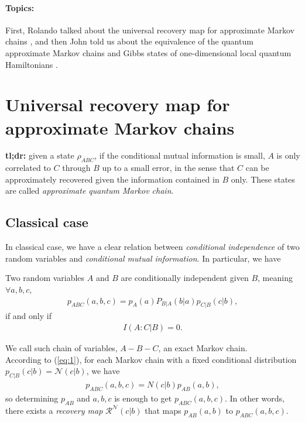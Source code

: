 \documentclass{article}
\begin{document}


\paragraph{Topics:}{First, Rolando talked about the universal recovery map for approximate Markov chains \cite{FR15}, and then John told us about the equivalence of the quantum approximate Markov chains and Gibbs states of one-dimensional local quantum Hamiltonians \cite{KB16}.}

 
\section{Universal recovery map for approximate Markov chains \cite{FR15}}
  \begin{mdframed}
 \textbf{tl;dr:} given a state $\rho_{ABC}$, if the conditional mutual information is small, $A$ is only correlated to $C$ through $B$ up to a small error, in the sense that $C$ can be approximately recovered given the information contained in $B$ only. These states are called \textit{approximate quantum Markov chain}. 
\end{mdframed}
\subsection{Classical case}
In classical case, we have a clear relation between \textit{conditional independence} of two random variables and \textit{conditional mutual information}. In particular, we have

\begin{thm}
Two random variables $A$ and $B$ are conditionally independent given $B$, meaning $\forall a,b,c$,
\begin{align}\label{eq:1}
p_{ABC}(a,b,c) = p_A(a)P_{B|A}(b|a)p_{C|B}(c|b),
\end{align}
if and only if
\begin{align}
	I(A:C|B)=0.
\end{align} 
 \end{thm}
We call such chain of variables, $A-B-C$, an exact Markov chain. \\

According to (\ref{eq:1}), for each Markov chain with a fixed conditional distribution $p_{C|B}(c|b)=\mathcal{N}(c|b)$, we have 
\begin{align*}
	p_{ABC}(a,b,c)=N(c|b)p_{AB}(a,b),
\end{align*} 
 so determining $p_{AB}$ and $a,b,c$ is enough to get $p_{ABC}(a,b,c)$. In other words, there exists a \textit{recovery map} $\mathcal{R}^{\mathcal{N}}(c|b)$ that maps $p_{AB}(a,b)$ to $p_{ABC}(a,b,c)$.\\
\end{document}
